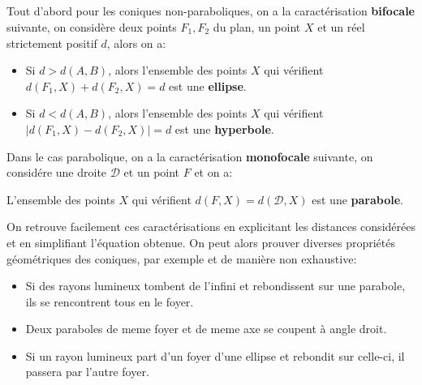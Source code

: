 \documentclass{report}
\begin{document}
\subsection*{}
Tout d'abord pour les coniques non-paraboliques, on a la caractérisation \textbf{bifocale} suivante, on considère deux points \(F_1, F_2\) du plan, un point \(X\) et un réel strictement positif \(d\), alors on a:
\begin{itemize}
   \item Si \(d > d(A, B)\), alors l'ensemble des points \(X\) qui vérifient \(d(F_1, X) + d(F_2, X) = d\) est une \textbf{ellipse}.
   \item Si \(d < d(A, B)\), alors l'ensemble des points \(X\) qui vérifient \(|d(F_1, X) - d(F_2, X)| = d\) est une \textbf{hyperbole}.
\end{itemize}

Dans le cas parabolique, on a la caractérisation \textbf{monofocale} suivante, on considére une droite \(\mathcal{D}\) et un point \(F\) et on a:
\begin{center}
   L'ensemble des points \(X\) qui vérifient \(d(F, X) = d(\mathcal{D}, X)\) est une \textbf{parabole}.
\end{center}
On retrouve facilement ces caractérisations en explicitant les distances considérées et en simplifiant l'équation obtenue. On peut alors prouver diverses propriétés géométriques des coniques, par exemple et de manière non exhaustive:
\begin{itemize}
   \item Si des rayons lumineux tombent de l'infini et rebondissent sur une parabole, ils se rencontrent tous en le foyer.
   \item Deux paraboles de meme foyer et de meme axe se coupent à angle droit.
   \item Si un rayon lumineux part d'un foyer d'une ellipse et rebondit sur celle-ci, il passera par l'autre foyer.
\end{itemize}

\subsection*{}
\end{document}
